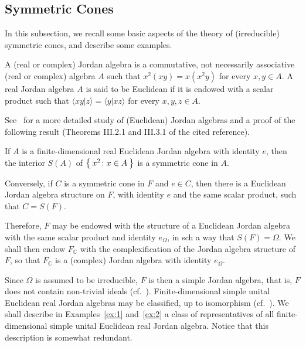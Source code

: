 \documentclass[10.5pt,reqno]{amsart}
\newcommand{\C}{\mathds{C}}
\begin{document}
\subsection{Symmetric Cones}\label{sec:Sym}

In this subsection, we recall some basic aspects of  the theory of (irreducible) symmetric cones, and describe some examples.


\begin{deff}
	A (real or complex) Jordan algebra is a commutative, not necessarily associative (real or complex) algebra $A$ such that $x^2(xy)=x(x^2 y)$ for every $x,y\in A$.
	A real Jordan algebra $A$ is said to be Euclidean if it is endowed with a scalar product such that $\langle x y\vert z\rangle=\langle y\vert x z\rangle$ for every $x,y,z\in A$.
\end{deff}

See~\cite{FarautKoranyi} for a more detailed study of (Euclidean) Jordan algebras and a proof of the following result (Theorems III.2.1 and III.3.1 of the cited reference).

\begin{prop}
	If $A$ is a finite-dimensional real Euclidean Jordan algebra with identity $e$, then the interior $S(A)$ of $\Set{x^2\colon x\in A} $ is a symmetric cone in $A$. 
	
	Conversely, if $C$ is a symmetric cone in $F$ and $e\in C$, then there is a Euclidean Jordan algebra structure on $F$, with identity $e$ and the same scalar product, such that $C=S(F)$.
\end{prop}

Therefore, $F$ may be endowed with the structure of a Euclidean Jordan algebra with the same scalar product and identity $e_\Omega$, in sch a way that $S(F)=\Omega$. 
We shall then endow $F_\C$ with the complexification of the Jordan algebra structure of $F$, so that $F_\C$ is a (complex) Jordan algebra with identity $e_\Omega$.

Since $\Omega$ is assumed to be irreducible, $F$ is then a simple Jordan algebra, that is, $F$ does not contain  non-trivial ideals (cf.~\cite[Propositions III.4.4 and III.4.5]{FarautKoranyi}).
Finite-dimensional simple unital Euclidean real Jordan algebras may be classified, up to isomorphism (cf.~\cite[Corollary IV.1.5 and Theorem V.3.7]{FarautKoranyi}). We shall describe in   Examples~\ref{ex:1} and~\ref{ex:2} a class of representatives of all finite-dimensional simple unital Euclidean real Jordan algebra. Notice that this description is somewhat redundant.
\end{document}
